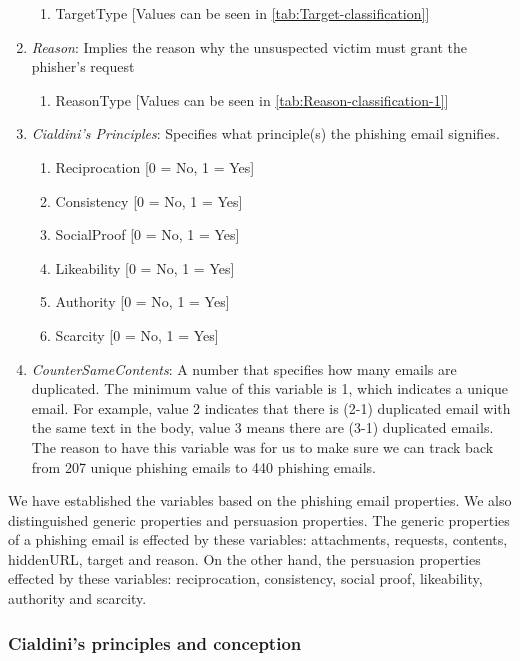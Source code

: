 \begin{enumerate}
\begin{enumerate}
\item TargetType {[}Values can be seen in \autoref{tab:Target-classification}{]}
\end{enumerate}
\item \emph{Reason}: Implies the reason why the unsuspected victim must
grant the phisher's request

\begin{enumerate}
\item ReasonType {[}Values can be seen in \autoref{tab:Reason-classification-1}{]}
\end{enumerate}
\item \emph{Cialdini's Principles}: Specifies what principle(s) the phishing
email signifies. 

\begin{enumerate}
\item Reciprocation {[}0 = No, 1 = Yes{]}
\item Consistency {[}0 = No, 1 = Yes{]}
\item SocialProof {[}0 = No, 1 = Yes{]}
\item Likeability {[}0 = No, 1 = Yes{]}
\item Authority {[}0 = No, 1 = Yes{]}
\item Scarcity {[}0 = No, 1 = Yes{]}
\end{enumerate}
\item \emph{CounterSameContents}: A number that specifies how many emails
are duplicated. The minimum value of this variable is 1, which indicates
a unique email. For example, value 2 indicates that there is (2-1)
duplicated email with the same text in the body, value 3 means there
are (3-1) duplicated emails. The reason to have this variable was
for us to make sure we can track back from 207 unique phishing emails
to 440 phishing emails.
\end{enumerate}
We have established the variables based on the phishing email properties.
We also distinguished generic properties and persuasion properties.
The generic properties of a phishing email is effected by these variables:
attachments, requests, contents, hiddenURL, target and reason. On
the other hand, the persuasion properties effected by these variables:
reciprocation, consistency, social proof, likeability, authority and
scarcity.


\subsubsection{\label{sub:cialdini}Cialdini's principles and conception}


